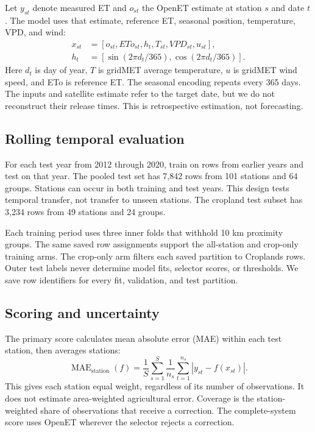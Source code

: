 \documentclass[10pt,letterpaper]{article}
\begin{document}
Let $y_{st}$ denote measured ET and $o_{st}$ the OpenET estimate at station $s$ and date $t$.
The model uses that estimate, reference ET, seasonal position, temperature, VPD, and wind:
\begin{equation}
\begin{aligned}
x_{st}&=[o_{st},ETo_{st},h_t,T_{st},VPD_{st},u_{st}],\\
h_t&=[\sin(2\pi d_t/365),\cos(2\pi d_t/365)].
\end{aligned}
\end{equation}
Here $d_t$ is day of year, $T$ is gridMET average temperature, $u$ is gridMET wind speed, and ETo is reference ET.
The seasonal encoding repeats every 365 days.
The inputs and satellite estimate refer to the target date, but we do not reconstruct their release times.
This is retrospective estimation, not forecasting.

\subsection{Rolling temporal evaluation}
For each test year from 2012 through 2020, train on rows from earlier years and test on that year.
The pooled test set has 7,842 rows from 101 stations and 64 groups.
Stations can occur in both training and test years.
This design tests temporal transfer, not transfer to unseen stations.
The cropland test subset has 3,234 rows from 49 stations and 24 groups.

Each training period uses three inner folds that withhold 10 km proximity groups.
The same saved row assignments support the all-station and crop-only training arms.
The crop-only arm filters each saved partition to Croplands rows.
Outer test labels never determine model fits, selector scores, or thresholds.
We save row identifiers for every fit, validation, and test partition.

\subsection{Scoring and uncertainty}
The primary score calculates mean absolute error (MAE) within each test station, then averages stations:
\begin{equation}
\operatorname{MAE}_{\mathrm{station}}(f)=
\frac{1}{S}\sum_{s=1}^{S}\frac{1}{n_s}\sum_{t=1}^{n_s}|y_{st}-f(x_{st})|.
\label{eq:macro}
\end{equation}
This gives each station equal weight, regardless of its number of observations.
It does not estimate area-weighted agricultural error.
Coverage is the station-weighted share of observations that receive a correction.
The complete-system score uses OpenET wherever the selector rejects a correction.
\end{document}
